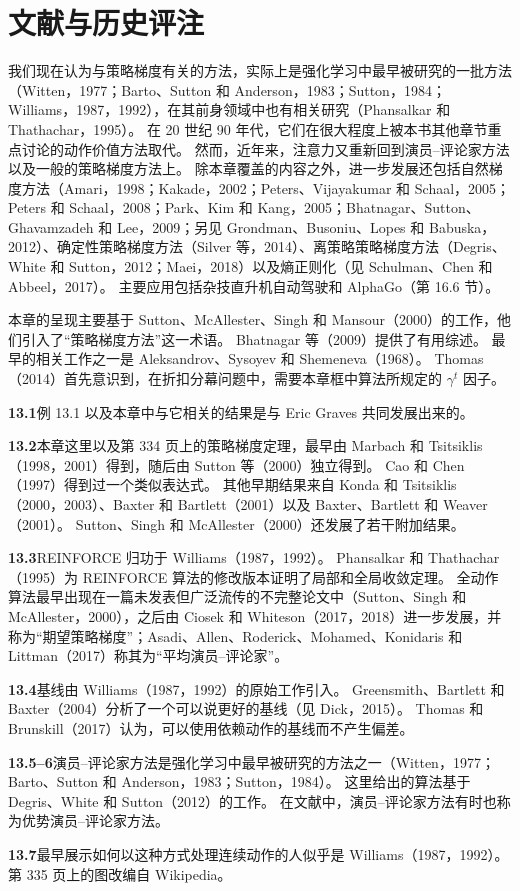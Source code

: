 \documentclass[UTF8,12pt,a4paper,fontset=fandol]{ctexart}
\begin{document}
\section*{文献与历史评注}

我们现在认为与策略梯度有关的方法，实际上是强化学习中最早被研究的一批方法（Witten，1977；Barto、Sutton 和 Anderson，1983；Sutton，1984；Williams，1987，1992），在其前身领域中也有相关研究（Phansalkar 和 Thathachar，1995）。
在 20 世纪 90 年代，它们在很大程度上被本书其他章节重点讨论的动作价值方法取代。
然而，近年来，注意力又重新回到演员--评论家方法以及一般的策略梯度方法上。
除本章覆盖的内容之外，进一步发展还包括自然梯度方法（Amari，1998；Kakade，2002；Peters、Vijayakumar 和 Schaal，2005；Peters 和 Schaal，2008；Park、Kim 和 Kang，2005；Bhatnagar、Sutton、Ghavamzadeh 和 Lee，2009；另见 Grondman、Busoniu、Lopes 和 Babuska，2012）、确定性策略梯度方法（Silver 等，2014）、离策略策略梯度方法（Degris、White 和 Sutton，2012；Maei，2018）以及熵正则化（见 Schulman、Chen 和 Abbeel，2017）。
主要应用包括杂技直升机自动驾驶和 AlphaGo（第 16.6 节）。

本章的呈现主要基于 Sutton、McAllester、Singh 和 Mansour（2000）的工作，他们引入了“策略梯度方法”这一术语。
Bhatnagar 等（2009）提供了有用综述。
最早的相关工作之一是 Aleksandrov、Sysoyev 和 Shemeneva（1968）。
Thomas（2014）首先意识到，在折扣分幕问题中，需要本章框中算法所规定的 $\gamma^t$ 因子。

\noindent\textbf{13.1}\quad 例 13.1 以及本章中与它相关的结果是与 Eric Graves 共同发展出来的。

\noindent\textbf{13.2}\quad 本章这里以及第 334 页上的策略梯度定理，最早由 Marbach 和 Tsitsiklis（1998，2001）得到，随后由 Sutton 等（2000）独立得到。
Cao 和 Chen（1997）得到过一个类似表达式。
其他早期结果来自 Konda 和 Tsitsiklis（2000，2003）、Baxter 和 Bartlett（2001）以及 Baxter、Bartlett 和 Weaver（2001）。
Sutton、Singh 和 McAllester（2000）还发展了若干附加结果。

\noindent\textbf{13.3}\quad REINFORCE 归功于 Williams（1987，1992）。
Phansalkar 和 Thathachar（1995）为 REINFORCE 算法的修改版本证明了局部和全局收敛定理。
全动作算法最早出现在一篇未发表但广泛流传的不完整论文中（Sutton、Singh 和 McAllester，2000），之后由 Ciosek 和 Whiteson（2017，2018）进一步发展，并称为“期望策略梯度”；Asadi、Allen、Roderick、Mohamed、Konidaris 和 Littman（2017）称其为“平均演员--评论家”。

\noindent\textbf{13.4}\quad 基线由 Williams（1987，1992）的原始工作引入。
Greensmith、Bartlett 和 Baxter（2004）分析了一个可以说更好的基线（见 Dick，2015）。
Thomas 和 Brunskill（2017）认为，可以使用依赖动作的基线而不产生偏差。

\noindent\textbf{13.5--6}\quad 演员--评论家方法是强化学习中最早被研究的方法之一（Witten，1977；Barto、Sutton 和 Anderson，1983；Sutton，1984）。
这里给出的算法基于 Degris、White 和 Sutton（2012）的工作。
在文献中，演员--评论家方法有时也称为优势演员--评论家方法。

\noindent\textbf{13.7}\quad 最早展示如何以这种方式处理连续动作的人似乎是 Williams（1987，1992）。
第 335 页上的图改编自 Wikipedia。
\end{document}
